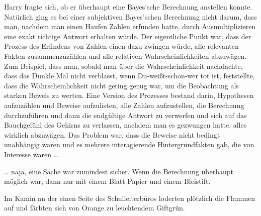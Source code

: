 Harry fragte sich, ob er überhaupt eine Bayes’sche Berechnung anstellen konnte. Natürlich ging es bei einer subjektiven Bayes’schen Berechnung nicht darum, dass man, nachdem man einen Haufen Zahlen erfunden hatte, durch Ausmultiplizieren eine exakt richtige Antwort erhalten würde. Der eigentliche Punkt war, dass der Prozess des Erfindens von Zahlen einen dazu zwingen würde, alle relevanten Fakten zusammenzuzählen und alle relativen Wahrscheinlichkeiten abzuwägen. Zum Beispiel, dass man, sobald man über die Wahrscheinlichkeit nachdachte, dass das Dunkle Mal nicht verblasst, wenn Du-weißt-schon-wer tot ist, feststellte, dass die Wahrscheinlichkeit nicht gering genug war, um die Beobachtung als starken Beweis zu werten. Eine Version des Prozesses bestand darin, Hypothesen aufzuzählen und Beweise aufzulisten, alle Zahlen aufzustellen, die Berechnung durchzuführen und dann die endgültige Antwort zu verwerfen und sich auf das Bauchgefühl des Gehirns zu verlassen, nachdem man es gezwungen hatte, alles wirklich abzuwägen. Das Problem war, dass die Beweise nicht bedingt unabhängig waren und es mehrere interagierende Hintergrundfakten gab, die von Interesse waren …

… naja, eine Sache war zumindest sicher. Wenn die Berechnung überhaupt möglich war, dann nur mit einem Blatt Papier und einem Bleistift.

Im Kamin an der einen Seite des Schulleiterbüros loderten plötzlich die Flammen auf und färbten sich von Orange zu leuchtendem Giftgrün.

